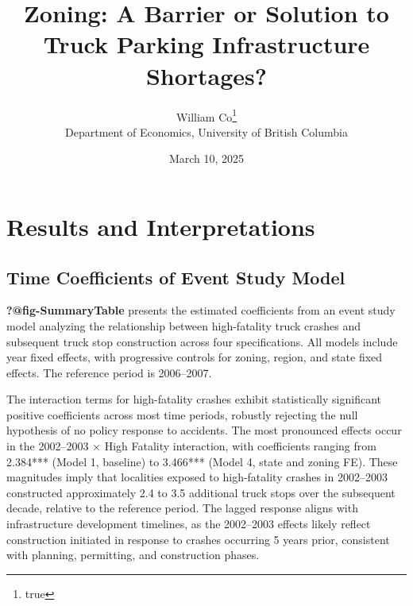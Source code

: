 \documentclass[
  8pt,
  12pt]{article}
\begin{document}
\def\spacingset#1{\renewcommand{\baselinestretch}%
{#1}\small\normalsize} \spacingset{1}



\date{March 10, 2025}
\title{\bf Zoning: A Barrier or Solution to Truck Parking Infrastructure
Shortages?}
\author{
William Co\thanks{true}\\
Department of Economics, University of British Columbia\\
}
\maketitle

\bigskip
\bigskip
\begin{abstract}

\end{abstract}


\newpage
\spacingset{1.9} %

\section{Results and Interpretations}\label{results-and-interpretations}

\subsection{Time Coefficients of Event Study
Model}\label{time-coefficients-of-event-study-model}

\textbf{?@fig-SummaryTable} presents the estimated coefficients from an
event study model analyzing the relationship between high-fatality truck
crashes and subsequent truck stop construction across four
specifications. All models include year fixed effects, with progressive
controls for zoning, region, and state fixed effects. The reference
period is 2006--2007.

The interaction terms for high-fatality crashes exhibit statistically
significant positive coefficients across most time periods, robustly
rejecting the null hypothesis of no policy response to accidents. The
most pronounced effects occur in the 2002--2003 × High Fatality
interaction, with coefficients ranging from 2.384*** (Model 1, baseline)
to 3.466*** (Model 4, state and zoning FE). These magnitudes imply that
localities exposed to high-fatality crashes in 2002--2003 constructed
approximately 2.4 to 3.5 additional truck stops over the subsequent
decade, relative to the reference period. The lagged response aligns
with infrastructure development timelines, as the 2002--2003 effects
likely reflect construction initiated in response to crashes occurring 5
years prior, consistent with planning, permitting, and construction
phases.
\end{document}
